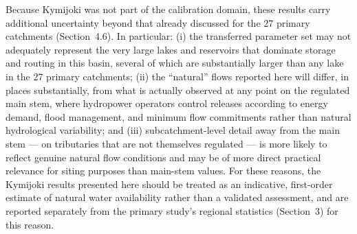 \documentclass[draft]{agujournal2019}
\begin{document}
Because Kymijoki was not part of the calibration domain, these results carry additional uncertainty beyond that already discussed for the 27 primary catchments (Section~4.6). In particular: (i) the transferred parameter set may not adequately represent the very large lakes and reservoirs that dominate storage and routing in this basin, several of which are substantially larger than any lake in the 27 primary catchments; (ii) the ``natural'' flows reported here will differ, in places substantially, from what is actually observed at any point on the regulated main stem, where hydropower operators control releases according to energy demand, flood management, and minimum flow commitments rather than natural hydrological variability; and (iii) subcatchment-level detail away from the main stem --- on tributaries that are not themselves regulated --- is more likely to reflect genuine natural flow conditions and may be of more direct practical relevance for siting purposes than main-stem values. For these reasons, the Kymijoki results presented here should be treated as an indicative, first-order estimate of natural water availability rather than a validated assessment, and are reported separately from the primary study's regional statistics (Section~3) for this reason.
\end{document}
